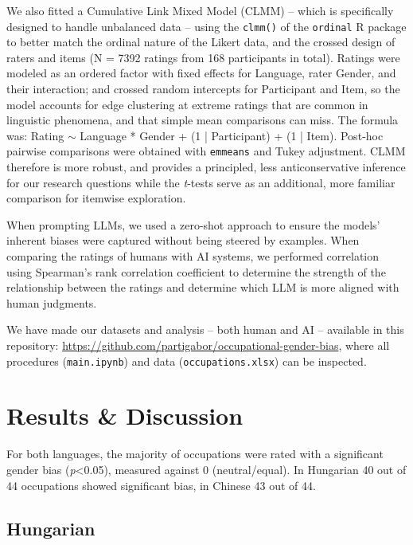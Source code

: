 \documentclass[runningheads]{llncs}
\begin{document}
We also fitted a Cumulative Link Mixed Model (CLMM) -- which is specifically designed to handle unbalanced data -- using the \texttt{clmm()} of the \texttt{ordinal} R package to better match the ordinal nature of the Likert data, and the crossed design of raters and items (N = 7392 ratings from 168 participants in total). Ratings were modeled as an ordered factor with fixed effects for Language, rater Gender, and their interaction; and crossed random intercepts for Participant and Item, so the model accounts for edge clustering at extreme ratings that are common in linguistic phenomena, and that simple mean comparisons can miss. The formula was: Rating $\sim$ Language * Gender + (1 | Participant) + (1 | Item). Post‑hoc pairwise comparisons were obtained with \texttt{emmeans} and Tukey adjustment. CLMM therefore is more robust, and provides a principled, less anticonservative inference for our research questions while the \textit{t}‑tests serve as an additional, more familiar comparison for itemwise exploration.

When prompting LLMs, we used a zero-shot approach to ensure the models' inherent biases were captured
without being steered by examples. When comparing the ratings of humans with AI systems, we performed correlation using Spearman's rank correlation coefficient to determine the strength of the relationship between the ratings and determine which LLM is more aligned with human judgments. 

We have made our datasets and analysis -- both human and AI -- available in this repository: \href{https://github.com/partigabor/occupational-gender-bias}{https://github.com/partigabor/occupational-gender-bias}, where all procedures (\texttt{main.ipynb}) and data (\texttt{occupations.xlsx}) can be inspected.



\section{Results \& Discussion}\label{sec:results}

For both languages, the majority of occupations were rated with a significant gender bias (\textit{p}<0.05), measured against 0 (neutral/equal). In Hungarian 40 out of 44 occupations showed significant bias, in Chinese 43 out of 44.

\subsection{Hungarian}
\end{document}
